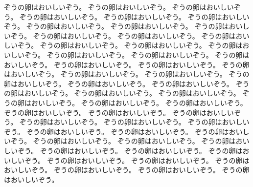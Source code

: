 ぞうの卵はおいしいぞう。
ぞうの卵はおいしいぞう。
ぞうの卵はおいしいぞう。
ぞうの卵はおいしいぞう。
ぞうの卵はおいしいぞう。
ぞうの卵はおいしいぞう。
ぞうの卵はおいしいぞう。
ぞうの卵はおいしいぞう。
ぞうの卵はおいしいぞう。
ぞうの卵はおいしいぞう。
ぞうの卵はおいしいぞう。
ぞうの卵はおいしいぞう。
ぞうの卵はおいしいぞう。
ぞうの卵はおいしいぞう。
ぞうの卵はおいしいぞう。
ぞうの卵はおいしいぞう。
ぞうの卵はおいしいぞう。
ぞうの卵はおいしいぞう。
ぞうの卵はおいしいぞう。
ぞうの卵はおいしいぞう。
ぞうの卵はおいしいぞう。
ぞうの卵はおいしいぞう。
ぞうの卵はおいしいぞう。
ぞうの卵はおいしいぞう。
ぞうの卵はおいしいぞう。
ぞうの卵はおいしいぞう。
ぞうの卵はおいしいぞう。
ぞうの卵はおいしいぞう。
ぞうの卵はおいしいぞう。
ぞうの卵はおいしいぞう。
ぞうの卵はおいしいぞう。
ぞうの卵はおいしいぞう。
ぞうの卵はおいしいぞう。
ぞうの卵はおいしいぞう。
ぞうの卵はおいしいぞう。
ぞうの卵はおいしいぞう。
ぞうの卵はおいしいぞう。
ぞうの卵はおいしいぞう。
ぞうの卵はおいしいぞう。
ぞうの卵はおいしいぞう。
ぞうの卵はおいしいぞう。
ぞうの卵はおいしいぞう。
ぞうの卵はおいしいぞう。
ぞうの卵はおいしいぞう。
ぞうの卵はおいしいぞう。
ぞうの卵はおいしいぞう。
ぞうの卵はおいしいぞう。
ぞうの卵はおいしいぞう。
ぞうの卵はおいしいぞう。
ぞうの卵はおいしいぞう。
ぞうの卵はおいしいぞう。
ぞうの卵はおいしいぞう。
ぞうの卵はおいしいぞう。
